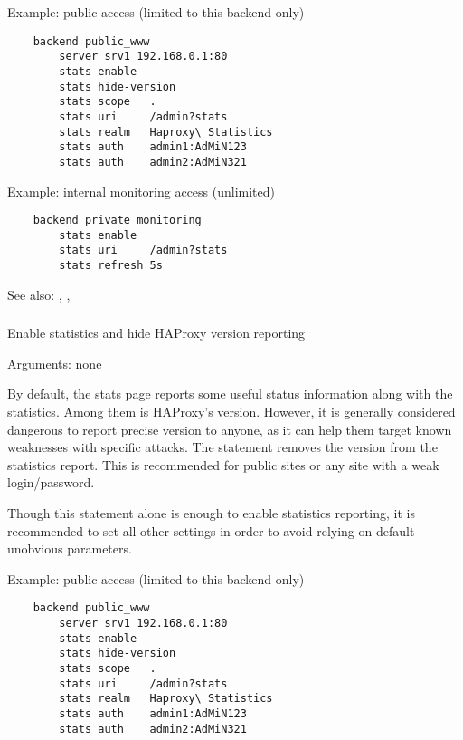 {  Example: public access (limited to this backend only)
  \begin{verbatim}
    backend public_www
        server srv1 192.168.0.1:80
        stats enable
        stats hide-version
        stats scope   .
        stats uri     /admin?stats
        stats realm   Haproxy\ Statistics
        stats auth    admin1:AdMiN123
        stats auth    admin2:AdMiN321
  \end{verbatim}
  
  Example: internal monitoring access (unlimited)
  \begin{verbatim}
    backend private_monitoring
        stats enable
        stats uri     /admin?stats
        stats refresh 5s
  \end{verbatim}

  See also: , , 


\subsubsection[stats hide-version]{}

  Enable statistics and hide HAProxy version reporting
 
 
  Arguments: none

  By default, the stats page reports some useful status information along with
  the statistics. Among them is HAProxy's version. However, it is generally
  considered dangerous to report precise version to anyone, as it can help them
  target known weaknesses with specific attacks. The 
  statement removes the version from the statistics report. This is recommended
  for public sites or any site with a weak login/password.

  Though this statement alone is enough to enable statistics reporting, it is
  recommended to set all other settings in order to avoid relying on default
  unobvious parameters.

  Example: public access (limited to this backend only)
  \begin{verbatim}
    backend public_www
        server srv1 192.168.0.1:80
        stats enable
        stats hide-version
        stats scope   .
        stats uri     /admin?stats
        stats realm   Haproxy\ Statistics
        stats auth    admin1:AdMiN123
        stats auth    admin2:AdMiN321
   \end{verbatim}

}
